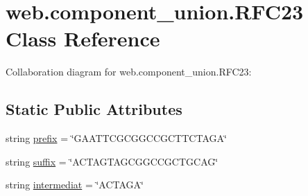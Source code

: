 \hypertarget{classweb_1_1component__union_1_1_r_f_c23}{\section{web.\-component\-\_\-union.\-R\-F\-C23 Class Reference}
\label{classweb_1_1component__union_1_1_r_f_c23}
}


Collaboration diagram for web.\-component\-\_\-union.\-R\-F\-C23\-:
\subsection*{Static Public Attributes}
\begin{DoxyCompactItemize}
\item 
string \hyperlink{classweb_1_1component__union_1_1_r_f_c23_abdc88199a66f17449ef9c9997da0e97a}{prefix} = \char`\"{}G\-A\-A\-T\-T\-C\-G\-C\-G\-G\-C\-C\-G\-C\-T\-T\-C\-T\-A\-G\-A\char`\"{}
\item 
string \hyperlink{classweb_1_1component__union_1_1_r_f_c23_ac0b9a3c7700f70059eaca989afb4b392}{suffix} = \char`\"{}A\-C\-T\-A\-G\-T\-A\-G\-C\-G\-G\-C\-C\-G\-C\-T\-G\-C\-A\-G\char`\"{}
\item 
string \hyperlink{classweb_1_1component__union_1_1_r_f_c23_abc3b7672763428384e052ccbfc264389}{intermediat} = \char`\"{}A\-C\-T\-A\-G\-A\char`\"{}
\end{DoxyCompactItemize}


